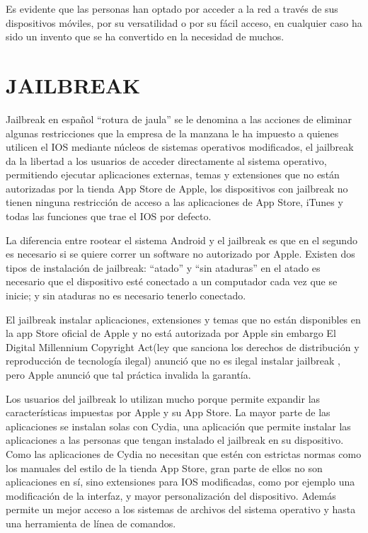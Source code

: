 Es evidente que las personas han optado por acceder a la red a
través de sus dispositivos móviles, por su versatilidad o por su
fácil acceso, en cualquier caso ha sido un invento que se ha
convertido en la necesidad de muchos.

\section*{JAILBREAK}

Jailbreak en español “rotura de jaula” se le denomina a las
acciones de eliminar algunas restricciones que la empresa de la
manzana le ha impuesto a quienes utilicen el IOS mediante
núcleos de sistemas operativos modificados, el jailbreak da la
libertad a los usuarios de acceder directamente al sistema
operativo, permitiendo ejecutar aplicaciones externas, temas y
extensiones que no están autorizadas por la tienda App Store de
Apple, los dispositivos con jailbreak no tienen ninguna
restricción de acceso a las aplicaciones de App Store, iTunes y
todas las funciones que trae el IOS por defecto.

La diferencia entre rootear el sistema Android y el jailbreak es
que en el segundo es necesario si se quiere correr un software
no autorizado por Apple. Existen dos tipos de instalación de
jailbreak: “atado” y “sin ataduras” en el atado es necesario que
el dispositivo esté conectado a un computador cada vez que se
inicie; y sin ataduras no es necesario tenerlo conectado.

El jailbreak instalar aplicaciones, extensiones y temas que no
están disponibles en la app Store oficial de Apple y no está
autorizada por Apple sin embargo El Digital Millennium
Copyright Act(ley que sanciona los derechos de distribución y
reproducción de tecnología ilegal) anunció que no es ilegal
instalar jailbreak , pero Apple anunció que tal práctica invalida
la garantía.

Los usuarios del jailbreak lo utilizan mucho porque permite
expandir las características impuestas por Apple y su App Store.
La mayor parte de las aplicaciones se instalan solas con Cydia,
una aplicación que permite instalar las aplicaciones a las
personas que tengan instalado el jailbreak en su dispositivo.
Como las aplicaciones de Cydia no necesitan que estén con
estrictas normas como los manuales del estilo de la tienda App
Store, gran parte de ellos no son aplicaciones en sí, sino
extensiones para IOS modificadas, como por ejemplo una
modificación de la interfaz, y mayor personalización del
dispositivo. Además permite un mejor acceso a los sistemas de
archivos del sistema operativo y hasta una herramienta de línea
de comandos.

